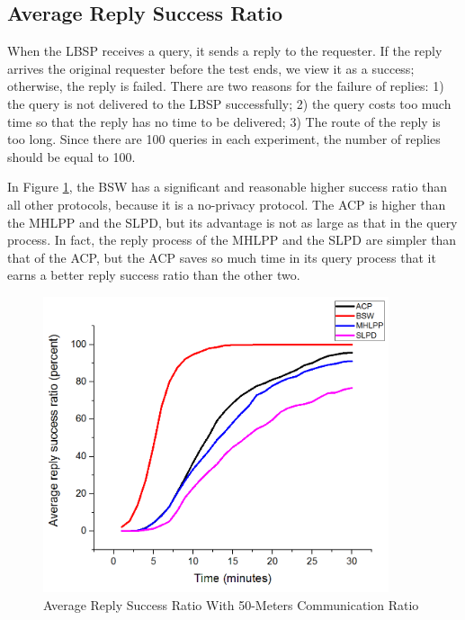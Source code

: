 \subsection{ Average Reply Success Ratio}

\noindent When the LBSP receives a query, it sends a reply to the requester. If the reply arrives the original requester before the test ends, we view it as a success; otherwise, the reply is failed. There are two reasons for the failure of replies: 1) the query is not delivered to the LBSP successfully; 2) the query costs too much time so that the reply has no time to be delivered; 3) The route of the reply is too long. Since there are 100 queries in each experiment, the number of replies should be equal to 100. 

In Figure \ref{fig:F417AverageReplySuccessRatioWith50MetersCommunicationRatio}, the BSW has a significant and reasonable higher success ratio than all other protocols, because it is a no-privacy protocol. The ACP is higher than the MHLPP and the SLPD, but its advantage is not as large as that in the query process. In fact, the reply process of the MHLPP and the SLPD are simpler than that of the ACP, but the ACP saves so much time in its query process that it earns a better reply success ratio than the other two.

\begin{figure} [hbtp]
  \centering 
  \includegraphics[width=4.0in]{figures/F417AverageReplySuccessRatioWith50MetersCommunicationRatio.png}
  \caption{Average Reply Success Ratio With 50-Meters Communication Ratio} 
  \label{fig:F417AverageReplySuccessRatioWith50MetersCommunicationRatio} %
\end{figure}

